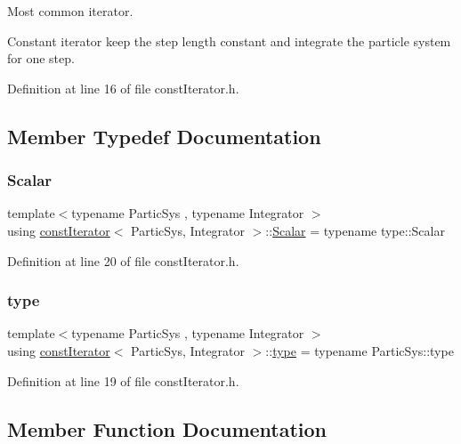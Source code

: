 Most common iterator. 

Constant iterator keep the step length constant and integrate the particle system for one step. 

Definition at line 16 of file const\+Iterator.\+h.



\subsection{Member Typedef Documentation}
\mbox{\label{classconst_iterator_a524fa9110f25e60075d8ec02e5f5bb71}} 
\subsubsection{\texorpdfstring{Scalar}{Scalar}}
{\footnotesize\ttfamily template$<$typename Partic\+Sys , typename Integrator $>$ \\
using \mbox{\hyperlink{classconst_iterator}{const\+Iterator}}$<$ Partic\+Sys, Integrator $>$\+::\mbox{\hyperlink{classconst_iterator_a524fa9110f25e60075d8ec02e5f5bb71}{Scalar}} =  typename type\+::\+Scalar}



Definition at line 20 of file const\+Iterator.\+h.

\mbox{\label{classconst_iterator_aa4809910ddae08b6ffd78046ee05061e}} 
\subsubsection{\texorpdfstring{type}{type}}
{\footnotesize\ttfamily template$<$typename Partic\+Sys , typename Integrator $>$ \\
using \mbox{\hyperlink{classconst_iterator}{const\+Iterator}}$<$ Partic\+Sys, Integrator $>$\+::\mbox{\hyperlink{classconst_iterator_aa4809910ddae08b6ffd78046ee05061e}{type}} =  typename Partic\+Sys\+::type}



Definition at line 19 of file const\+Iterator.\+h.



\subsection{Member Function Documentation}
\mbox{\label{classconst_iterator_af7cdfe1f6ab00dab9942645d5306ea32}} 
